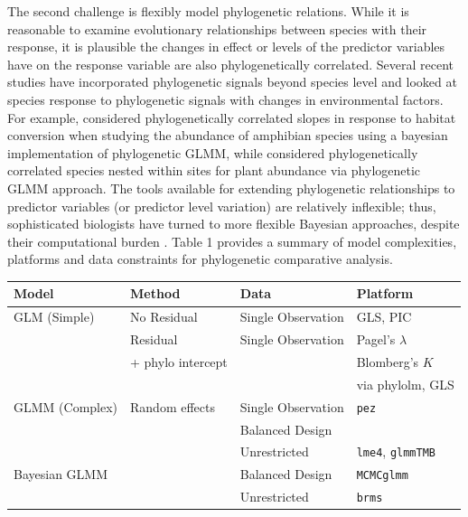 \documentclass[12pt]{article}
\begin{document}
The second challenge is flexibly model phylogenetic relations.
While it is reasonable to examine evolutionary relationships between species with their response, it is plausible the changes in effect or levels of the predictor variables have on the response variable are also phylogenetically correlated. 
Several recent studies have incorporated phylogenetic signals beyond species level and looked at species response to phylogenetic signals with changes in environmental factors.
For example, \cite{nowakowski2018phylogenetic} considered phylogenetically correlated slopes in response to habitat conversion when studying the abundance of amphibian species using a bayesian implementation of phylogenetic GLMM, while \cite{li2017canfun} considered phylogenetically correlated species nested within sites for plant abundance via phylogenetic GLMM approach. 
The tools available for extending phylogenetic relationships to predictor variables (or predictor level variation) are relatively inflexible; thus, sophisticated biologists have turned to more flexible Bayesian approaches, despite their computational burden \citep{hadfield2010mcmc, burkner2016brms}.
Table 1 provides a summary of model complexities, platforms and data constraints for phylogenetic comparative analysis.

\newcommand{\pkg}[1]{{\tt #1}}
\newcommand{\code}[1]{{\tt #1}}

\begin{tabularx}{\textwidth}{|X|X|X|X|}
\hline
Model & Method & Data & Platform \\
\hline
\hline
GLM (Simple)  & No Residual & Single Observation & GLS, PIC \\
\hline
              & Residual    & Single Observation & Pagel's $\lambda$ \\
              & + phylo intercept &                    & Blomberg's $K$ \\ 
              &             &                    & via phylolm, GLS \\
\hline
GLMM (Complex)& Random effects & Single Observation & \pkg{pez} \\ 
              &                & Balanced Design &  \\
\hline
              &                & Unrestricted  & \pkg{lme4}, \pkg{glmmTMB} \\
\hline
Bayesian GLMM &                & Balanced Design & \pkg{MCMCglmm} \\ 
\hline        
              &                & Unrestricted   & \pkg{brms} \\
\hline
\end{tabularx}
\end{document}
